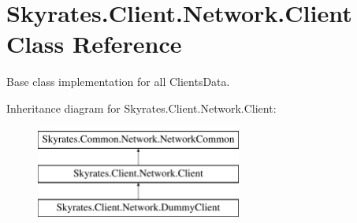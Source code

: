 \hypertarget{class_skyrates_1_1_client_1_1_network_1_1_client}{\section{Skyrates.\-Client.\-Network.\-Client Class Reference}
\label{class_skyrates_1_1_client_1_1_network_1_1_client}
}


Base class implementation for all Clients\-Data.  


Inheritance diagram for Skyrates.\-Client.\-Network.\-Client\-:\begin{figure}[H]
\begin{center}
\leavevmode
\includegraphics[height=3.000000cm]{class_skyrates_1_1_client_1_1_network_1_1_client}
\end{center}
\end{figure}
